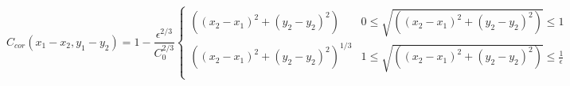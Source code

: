 \begin{equation}
  C_{cor}(x_1-x_2,y_1-y_2) = 1 - \frac{\epsilon^{2/3} }{C_0^{2/3}}
    \begin{cases}
         \left((x_2-x_1)^{2} + (y_2-y_2)^{2}\right) & 0 \leq \sqrt{\left((x_2-x_1)^{2} + (y_2-y_2)^{2}\right)} \leq  1  \\
        \left((x_2-x_1)^{2} + (y_2-y_2)^{2}\right)^{1/3} & 1 \leq \sqrt{\left((x_2-x_1)^{2} + (y_2-y_2)^{2}\right)}  \leq  \frac{1}{\epsilon} \\
   \end{cases}
\end{equation}

